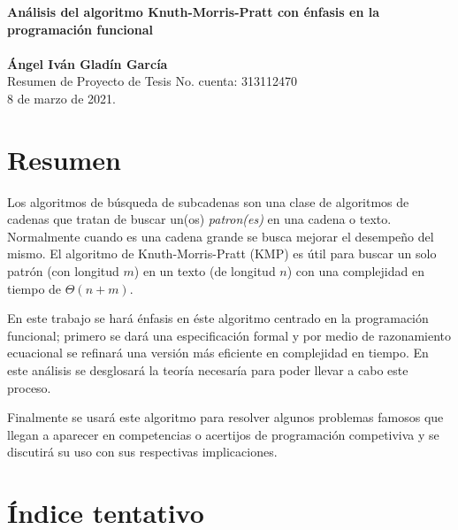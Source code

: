 \documentclass[letterpaper,10pt]{article}
\begin{document}
\noindent
\large
\textbf{Análisis del algoritmo Knuth-Morris-Pratt con énfasis en la programación funcional} \\\\
\textbf{Ángel Iván Gladín García} \\
\normalsize Resumen de Proyecto de Tesis       \hfill No. cuenta: 313112470\\
\hfill 8 de marzo de 2021.\\

\vspace*{-15pt}

\section{Resumen}
Los algoritmos de búsqueda de subcadenas son una clase de algoritmos de cadenas que tratan de
buscar un(os) \emph{patron(es)} en una cadena o texto. Normalmente cuando es una cadena grande se
busca mejorar el desempeño del mismo. El algoritmo de Knuth-Morris-Pratt (KMP) es útil para buscar
un solo patrón (con longitud $m$) en un texto (de longitud $n$) con una complejidad en tiempo de
$\Theta(n + m)$.

En este trabajo se hará énfasis en éste algoritmo centrado en la programación funcional; primero se
dará una especificación formal y por medio de razonamiento ecuacional se refinará una versión
más eficiente en complejidad en tiempo. En este análisis se desglosará la teoría necesaría para
poder llevar a cabo este proceso.

Finalmente se usará este algoritmo para resolver algunos problemas famosos que llegan a aparecer
en competencias o acertijos de programación competiviva y se discutirá su uso con sus respectivas
implicaciones.

\section{Índice tentativo}
\end{document}
